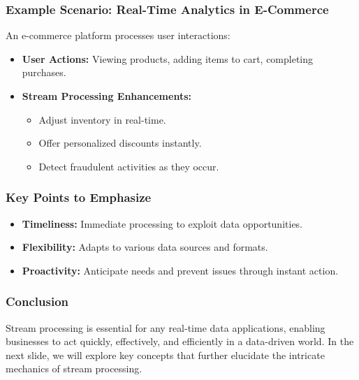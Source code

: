 \documentclass[aspectratio=169]{beamer}
\begin{document}
\begin{frame}[fragile]
    \frametitle{Example Scenario: Real-Time Analytics in E-Commerce}
    An e-commerce platform processes user interactions:
    \begin{itemize}
        \item \textbf{User Actions:} Viewing products, adding items to cart, completing purchases.
        \item \textbf{Stream Processing Enhancements:}
            \begin{itemize}
                \item Adjust inventory in real-time.
                \item Offer personalized discounts instantly.
                \item Detect fraudulent activities as they occur.
            \end{itemize}
    \end{itemize}
\end{frame}

\begin{frame}[fragile]
    \frametitle{Key Points to Emphasize}
    \begin{itemize}
        \item \textbf{Timeliness:} Immediate processing to exploit data opportunities.
        \item \textbf{Flexibility:} Adapts to various data sources and formats.
        \item \textbf{Proactivity:} Anticipate needs and prevent issues through instant action.
    \end{itemize}
\end{frame}

\begin{frame}[fragile]
    \frametitle{Conclusion}
    Stream processing is essential for any real-time data applications, enabling businesses to act quickly, effectively, and efficiently in a data-driven world. 
    \newline
    In the next slide, we will explore key concepts that further elucidate the intricate mechanics of stream processing.
\end{frame}
\end{document}
